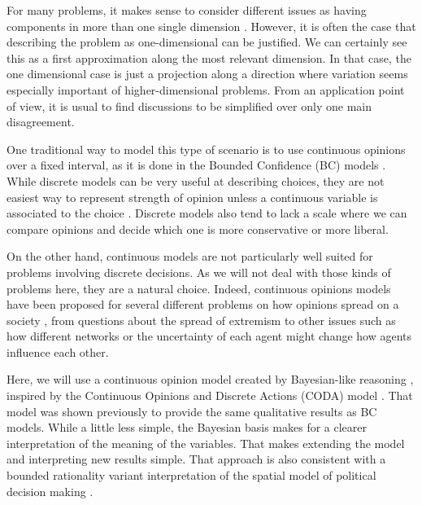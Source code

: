 \documentclass{article}
\begin{document}
For many problems, it makes sense to consider different issues as having components in
more than one single dimension \cite{vicenteetal08b}. However, it is often the case that describing the problem as
one-dimensional can be justified. We can certainly see this as a
first approximation along the most relevant dimension. In that case, the one dimensional case is
just a projection along a direction where variation seems especially important of higher-dimensional problems. From an application point of view, it is usual to find discussions to be simplified over only one main disagreement.  

One traditional way to model this type of scenario is to use continuous opinions
over a fixed interval, as it is done in the Bounded Confidence (BC) models
\cite{deffuantetal00,hegselmannkrause02}. While discrete models
\cite{galametal82,galammoscovici91,sznajd00} can be very useful at describing
choices, they are not easiest way to represent strength of opinion unless a
continuous variable is associated to the choice \cite{martins08a}. Discrete
models also tend to lack a scale where we can compare opinions and decide which
one is more conservative or more liberal.

On the other hand, continuous models are not particularly well suited for
problems involving discrete decisions. As we will not deal with those kinds of
problems here, they are a natural choice. Indeed, continuous opinions models
have been proposed for several different problems on how opinions spread on a
society \cite{deffuantetal02a,weisbuchetal05}, from questions about the spread
of extremism
\cite{amblarddeffuant04,gargiulomazzoni08a,franksetal08a,alizadeh14a,Albi2016,Mai2017}
to other issues such as how different networks
\cite{Kurmyshev2011,Acemoglu2011,Das2014,Hu2017} or the uncertainty of each
agent \cite{deffuant06} might change how agents influence each other.

Here, we will use a continuous opinion model created by Bayesian-like reasoning
\cite{martins08c}, inspired by the Continuous Opinions and Discrete Actions
(CODA) model \cite{martins08a,martins12b}. That model was shown previously
\cite{martins08c} to provide the same qualitative results as BC models. While a
little less simple, the Bayesian basis makes for a clearer interpretation of the
meaning of the variables. That makes extending the model and interpreting new
results simple. That approach is also consistent with a bounded rationality
variant interpretation of the spatial model of political decision making
\cite{humphreys2010spatial,ostrom1998behavioral}.
\end{document}
